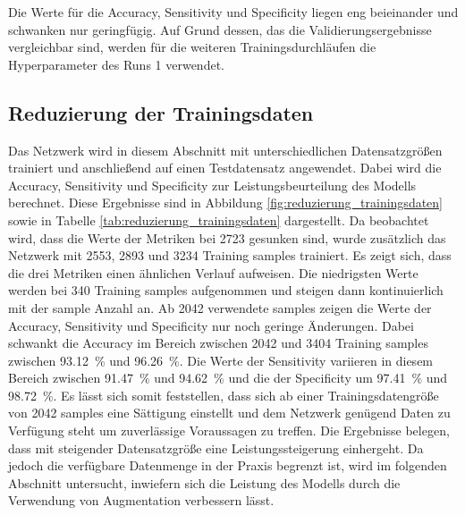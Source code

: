 Die Werte für die Accuracy, Sensitivity und Specificity liegen eng beieinander und schwanken nur geringfügig.
Auf Grund dessen, das die Validierungsergebnisse vergleichbar sind, werden für die weiteren Trainingsdurchläufen die Hyperparameter des Runs 1 verwendet. 

\subsection{Reduzierung der Trainingsdaten}
Das Netzwerk wird in diesem Abschnitt mit unterschiedlichen Datensatzgrößen trainiert und anschließend auf einen Testdatensatz angewendet.
Dabei wird die Accuracy, Sensitivity und Specificity zur Leistungsbeurteilung des Modells berechnet.
Diese Ergebnisse sind in Abbildung \ref{fig:reduzierung_trainingsdaten} sowie in Tabelle \ref{tab:reduzierung_trainingsdaten} dargestellt.
Da beobachtet wird, dass die Werte der Metriken bei 2723 gesunken sind, wurde zusätzlich das Netzwerk mit 2553, 2893 und 3234 
Training samples trainiert.
Es zeigt sich, dass die drei Metriken einen ähnlichen Verlauf aufweisen.
Die niedrigsten Werte werden bei 340 Training samples aufgenommen und steigen dann kontinuierlich mit der sample Anzahl an.
Ab 2042 verwendete samples zeigen die Werte der Accuracy, Sensitivity und Specificity nur noch geringe Änderungen.
Dabei schwankt die Accuracy im Bereich zwischen 2042 und 3404 Training samples zwischen \SI{93.12}{\%} und \qty{96.26}{\%}. 
Die Werte der Sensitivity variieren in diesem Bereich zwischen \SI{91.47}{\%} und \SI{94,62}{\%} und die der Specificity um \SI{97.41}{\%} und \SI{98.72}{\%}.
Es lässt sich somit feststellen, dass sich ab einer Trainingsdatengröße von 2042 samples eine Sättigung einstellt und dem Netzwerk genügend Daten zu Verfügung steht um zuverlässige Voraussagen zu treffen. 
Die Ergebnisse belegen, dass mit steigender Datensatzgröße eine Leistungssteigerung einhergeht.
Da jedoch die verfügbare Datenmenge in der Praxis begrenzt ist, wird im folgenden Abschnitt untersucht, inwiefern sich die Leistung des Modells durch die Verwendung von Augmentation verbessern lässt. 
